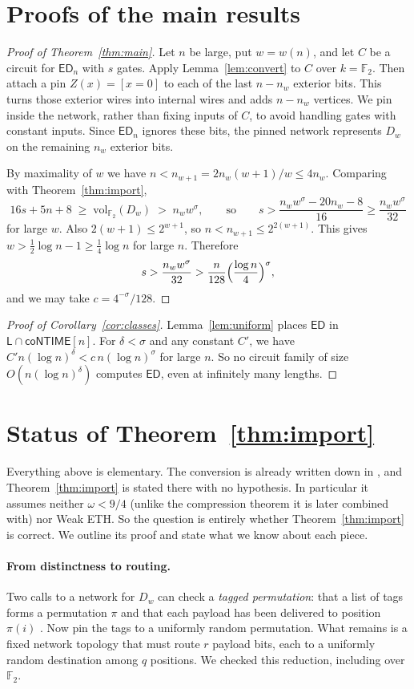 \documentclass[11pt]{article}
\theoremstyle{definition}
\theoremstyle{remark}
\newcommand{\ED}{\mathsf{ED}}
\newcommand{\vol}{\mathrm{vol}}
\newcommand{\F}{\mathbb{F}}
\newcommand{\coNTIME}{\mathsf{coNTIME}}
\newcommand{\Lclass}{\mathsf{L}}
\begin{document}
\section{Proofs of the main results}
\begin{proof}[Proof of Theorem~\ref{thm:main}]
Let $n$ be large, put $w=w(n)$, and let $C$ be a circuit for $\ED_n$ with
$s$ gates. Apply Lemma~\ref{lem:convert} to $C$ over $k=\F_2$. Then attach
a pin $Z(x)=[x=0]$ to each of the last $n-n_w$ exterior bits. This turns
those exterior wires into internal wires and adds $n-n_w$ vertices. We
pin inside the network, rather than fixing inputs of $C$, to avoid
handling gates with constant inputs. Since $\ED_n$ ignores these bits,
the pinned network represents $D_w$ on the remaining $n_w$ exterior bits.

By maximality of $w$ we have $n<n_{w+1}=2n_w(w+1)/w\le4n_w$. Comparing
with Theorem~\ref{thm:import},
\[
16s+5n+8\;\ge\;\vol_{\F_2}(D_w)\;>\;n_w w^{\sigma},
\qquad\text{so}\qquad
s>\frac{n_w w^{\sigma}-20n_w-8}{16}\ge\frac{n_w w^{\sigma}}{32}
\]
for large $w$. Also $2(w+1)\le2^{w+1}$, so $n<n_{w+1}\le 2^{2(w+1)}$.
This gives $w>\tfrac12\log n-1\ge\tfrac14\log n$ for large $n$. Therefore
\[
s>\frac{n_w w^{\sigma}}{32}>\frac{n}{128}\Bigl(\frac{\log n}{4}\Bigr)^{\sigma},
\]
and we may take $c=4^{-\sigma}/128$.
\end{proof}

\begin{proof}[Proof of Corollary~\ref{cor:classes}]
Lemma~\ref{lem:uniform} places $\ED$ in $\Lclass\cap\coNTIME[n]$. For
$\delta<\sigma$ and any constant $C'$, we have
$C'n(\log n)^{\delta}<c\,n(\log n)^{\sigma}$ for large $n$. So no circuit
family of size $O(n(\log n)^\delta)$ computes $\ED$, even at infinitely
many lengths.
\end{proof}

\section{Status of Theorem~\ref{thm:import}}\label{sec:status}
Everything above is elementary. The conversion is already written down
in \cite{OAI}, and Theorem~\ref{thm:import} is stated there with no
hypothesis. In particular it assumes neither $\omega<9/4$ (unlike the
compression theorem it is later combined with) nor Weak ETH. So the
question is entirely whether Theorem~\ref{thm:import} is correct. We
outline its proof and state what we know about each piece.

\paragraph{From distinctness to routing.}
Two calls to a network for $D_w$ can check a \emph{tagged permutation}:
that a list of tags forms a permutation $\pi$ and that each payload has
been delivered to position $\pi(i)$ \cite[Section~4.1]{OAI}. Now pin the
tags to a uniformly random permutation. What remains is a fixed network
topology that must route $r$ payload bits, each to a uniformly random
destination among $q$ positions. We checked this reduction, including
over $\F_2$.
\end{document}
